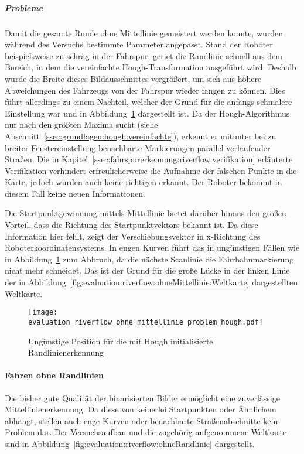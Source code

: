 \subparagraph{Probleme}
Damit die gesamte Runde ohne Mittellinie gemeistert werden konnte, wurden während des Versuchs bestimmte Parameter angepasst. Stand der Roboter beispielsweise zu schräg in der Fahrspur, geriet die Randlinie schnell aus dem Bereich, in dem die vereinfachte Hough-Transformation ausgeführt wird. Deshalb wurde die Breite dieses Bildausschnittes vergrößert, um sich aus höhere Abweichungen des Fahrzeugs von der Fahrspur wieder fangen zu können. Dies führt allerdings zu einem Nachteil, welcher der Grund für die anfangs schmalere Einstellung war und in Abbildung~\ref{fig:evaluation:riverflow:ohneMittellinie:problem} dargestellt ist. Da der Hough-Algorithmus nur nach den größten Maxima sucht (siehe Abschnitt~\ref{ssec:grundlagen:hough:vereinfachte}), erkennt er mitunter bei zu breiter Fenstereinstellung benachbarte Markierungen parallel verlaufender Straßen. Die in Kapitel~\ref{ssec:fahrspurerkennung:riverflow:verifikation} erläuterte Verifikation verhindert erfreulicherweise die Aufnahme der falschen Punkte in die Karte, jedoch wurden auch keine richtigen erkannt. Der Roboter bekommt in diesem Fall keine neuen Informationen. 

Die Startpunktgewinnung mittels Mittellinie bietet darüber hinaus den großen Vorteil, dass die Richtung des Startpunktvektors bekannt ist. Da diese Information hier fehlt, zeigt der Verschiebungsvektor in x-Richtung des Roboterkoordinatensystems. In engen Kurven führt das in ungünstigen Fällen wie in Abbildung~\ref{fig:evaluation:riverflow:ohneMittellinie:problem} zum Abbruch, da die nächste Scanlinie die Fahrbahnmarkierung nicht mehr schneidet. Das ist der Grund für die große Lücke in der linken Linie der in Abbildung~\ref{fig:evaluation:riverflow:ohneMittellinie:Weltkarte} dargestellten Weltkarte. 

\begin{figure}[htbp] %
	\centering
	\texttt{[image: evaluation\_riverflow\_ohne\_mittellinie\_problem\_hough.pdf]}
	\caption{Ungünstige Position für die mit Hough initialisierte Randlinienerkennung}
	\label{fig:evaluation:riverflow:ohneMittellinie:problem}
\end{figure}

\paragraph{Fahren ohne Randlinien}
Die bisher gute Qualität der binarisierten Bilder ermöglicht eine zuverlässige Mittellinienerkennung. Da diese von keinerlei Startpunkten oder Ähnlichem abhängt, stellen auch enge Kurven oder benachbarte Straßenabschnitte kein Problem dar. Der Versuchsaufbau und die zugehörig aufgenommene Weltkarte sind in Abbildung~\ref{fig:evaluation:riverflow:ohneRandlinie} dargestellt.

